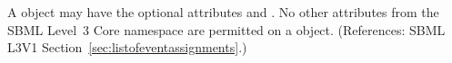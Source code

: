 A \ListOfEventAssignments object may have the optional attributes
 and .  No other attributes from the SBML
Level~3 Core namespace are permitted on a \ListOfEventAssignments object.
(References: SBML L3V1 Section~\ref{sec:listofeventassignments}.)
